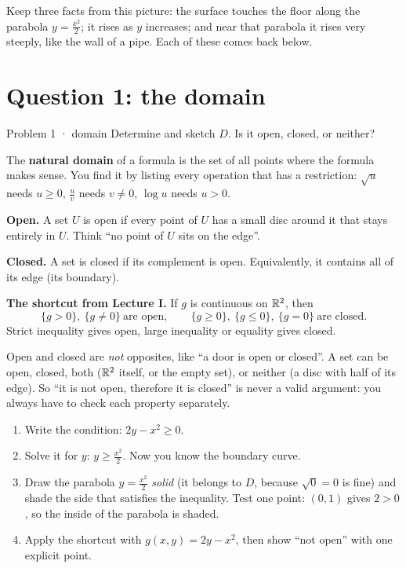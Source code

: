 
Keep three facts from this picture: the surface touches the floor along the parabola $y=\frac{x^2}2$;
it rises as $y$ increases; and near that parabola it rises very steeply, like the wall of a pipe.
Each of these comes back below.

\section{Question 1: the domain}

\begin{question}{Problem 1 \;·\; domain}
Determine and sketch $D$. Is it open, closed, or neither?
\end{question}

\begin{lesson}
The \textbf{natural domain} of a formula is the set of all points where the formula makes sense.
You find it by listing every operation that has a restriction:
$\sqrt u$ needs $u\ge0$, $\frac uv$ needs $v\ne0$, $\log u$ needs $u>0$.

\smallskip
\textbf{Open.} A set $U$ is open if every point of $U$ has a small disc around it that stays
entirely in $U$. Think ``no point of $U$ sits on the edge''.

\textbf{Closed.} A set is closed if its complement is open. Equivalently, it contains all of its
edge (its boundary).

\textbf{The shortcut from Lecture I.} If $g$ is continuous on $\mathbb{R}^2$, then
\[
 \{g>0\},\ \{g\ne0\}\ \text{are open},\qquad \{g\ge0\},\ \{g\le0\},\ \{g=0\}\ \text{are closed}.
\]
Strict inequality gives open, large inequality or equality gives closed.
\end{lesson}

\begin{intuition}
Open and closed are \emph{not} opposites, like ``a door is open or closed''. A set can be open, closed,
both ($\mathbb{R}^2$ itself, or the empty set), or neither (a disc with half of its edge). So ``it is not open,
therefore it is closed'' is never a valid argument: you always have to check each property separately.
\end{intuition}

\begin{howto}
\begin{enumerate}
  \item Write the condition: $2y-x^2\ge0$.
  \item Solve it for $y$: $y\ge\frac{x^2}2$. Now you know the boundary curve.
  \item Draw the parabola $y=\frac{x^2}2$ \emph{solid} (it belongs to $D$, because $\sqrt0=0$ is fine)
        and shade the side that satisfies the inequality. Test one point: $(0,1)$ gives $2>0$, so
        the inside of the parabola is shaded.
  \item Apply the shortcut with $g(x,y)=2y-x^2$, then show ``not open'' with one explicit point.
\end{enumerate}
\end{howto}


